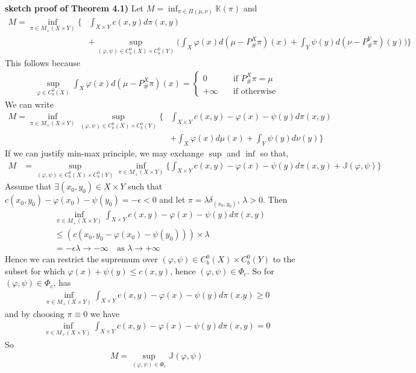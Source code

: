 \documentclass[12pt,a4paper]{article}
\newenvironment{proof}
{\begin{changemargin}{1cm}{0.5cm} 
	}%
	{\end{changemargin}
}
\newenvironment{p}
{\begin{proof} 
	}%
	{\end{proof}
}
\begin{document}
\begin{p}
\textbf{sketch proof of Theorem 4.1)} Let $M = \inf_{\pi \in \Pi(\mu, \nu)} \mathbb{K}(\pi)$ and
\begin{align*}
M = \inf_{\pi \in M_+ (X \times Y)} \Big\{ & \int_{X\times Y} c(x,y) d\pi(x,y) \\
& + \sup_{(\varphi, \psi) \in C_b^0(X)\times C_b^0(Y)} \Big( \int_X \varphi(x) d(\mu - P^X_{\#}\pi)(x) + \int_Y \psi(y) d(\nu - P^Y_{\#}\pi)(y) \Big) \Big\}
\end{align*}
This follows because
\begin{align*}
\sup_{\varphi \in C_b^0 (X)} \int_X \varphi(x) d(\mu - P^X_{\#}\pi)(x) = \begin{cases}
0 \quad &\text{if } P^X_{\#} \pi =\mu\\
+ \infty \quad &\text{if otherwise}
\end{cases}
\end{align*}
We can write
\begin{align*}
M = \inf_{\pi \in M_+ (X\times Y)} \sup_{(\varphi, \psi) \in C_b^0(X) \times C_b^0(Y)} \Big\{ & \int_{X\times Y} c(x,y) - \varphi(x) - \psi(y) d\pi(x,y)\\
& + \int_X \varphi(x) d\mu(x) + \int_Y \psi(y) d \nu(y)\Big\}
\end{align*}
If we can justify min-max principle, we may exchange $\sup$ and $\inf$ so that,
\begin{align*}
M &=  \sup_{(\varphi, \psi) \in C_b^0(X) \times C_b^0(Y)} \inf_{\pi \in M_+ (X\times Y)} \Big\{ \int_{X\times Y} c(x,y) - \varphi(x) - \psi(y) d\pi(x,y) + \mathbb{J}(\varphi, \psi) \Big\}
\end{align*}
Assume that $\exists (x_0, y_0) \in X\times Y$ such that $c(x_0, y_0) - \varphi(x_0) - \psi(y_0) =-\epsilon < 0$ and let $\pi =\lambda\delta_{(x_0, y_0)}$, $\lambda >0$. Then
\begin{align*}
&\inf_{\pi \in M_+ (X\times Y)} \int_{X\times Y} c(x,y) - \varphi(x) - \psi(y) d\pi(x,y) \\
& \leq (c(x_0, y_0 - \varphi(x_0) - \psi(y_0))) \times \lambda\\
&= -\epsilon \lambda \rightarrow -\infty \quad \text{as } \lambda \rightarrow + \infty
\end{align*}
Hence we can restrict the supremum over $(\varphi, \psi) \in C^0_b(X) \times C_b^0(Y)$ to the subset for which $\varphi(x) + \psi(y)\leq c(x,y)$, hence $(\varphi, \psi) \in \Phi_c$. So for $(\varphi, \psi) \in \Phi_c$, has
\begin{align*}
\inf_{\pi \in M_+(X\times Y)} \int_{X\times Y} c(x,y) -\varphi(x) - \psi(y) d\pi(x.y) \geq 0
\end{align*}
and by choosing $\pi \equiv 0$ we have 
\begin{align*}
\inf_{\pi \in M_+(X\times Y)} \int_{X\times Y} c(x,y) -\varphi(x) - \psi(y) d\pi(x,y)=0
\end{align*}
So
\begin{align*}
M =\sup_{(\varphi, \psi) \in \Phi_c} \mathbb{J}(\varphi, \psi)
\end{align*}
\end{p}
\s
\end{document}
